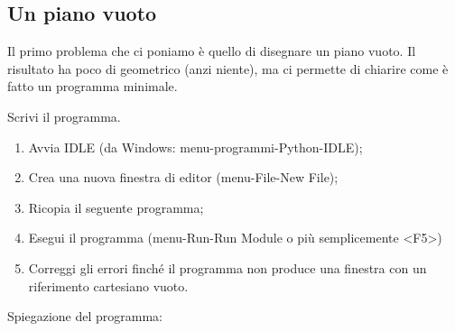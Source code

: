 \subsection{Un piano vuoto}
\label{subsec:geo_int_pianovuoto}
Il primo problema che ci poniamo è quello di disegnare un piano vuoto. Il 
risultato ha poco di geometrico (anzi niente), ma ci permette di chiarire come 
è fatto un programma minimale.

\begin{procedura}
Scrivi il programma.
\begin{enumerate}
 \item Avvia IDLE (da Windows: menu-programmi-Python-IDLE);
 \item Crea una nuova finestra di editor (menu-File-New File);
 \item Ricopia il seguente programma;
 \item Esegui il programma (menu-Run-Run Module o più semplicemente <F5>)
 \item Correggi gli errori finché il programma non produce una finestra con un 
riferimento cartesiano vuoto.
\end{enumerate}
\end{procedura}



Spiegazione del programma:

